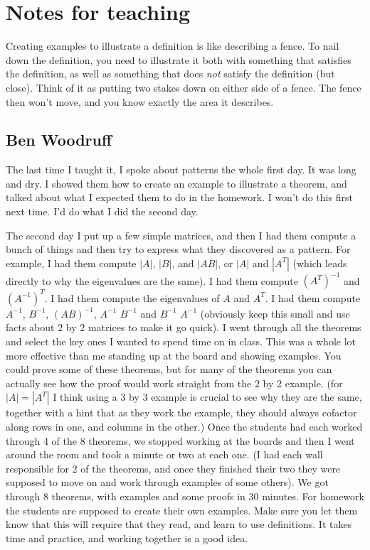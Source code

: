 \section{Notes for teaching}

Creating examples to illustrate a definition is like describing a fence.  To nail down the definition, you need to illustrate it both with something that satisfies the definition, as well as something that does \emph{not} satisfy the definition (but close).  Think of it as putting two stakes down on either side of a fence.  The fence then won't move, and you know exactly the area it describes.

\subsection{Ben Woodruff}
\label{sec:ben-woodruff}


The last time I taught it, I spoke about patterns the whole first day. It was long and dry.  I showed them how to create an example to illustrate a theorem, and talked about what I expected them to do in the homework.  I won't do this first next time.  I'd do what I did the second day.

The second day I put up a few simple matrices, and then I had them compute a bunch of things and then try to express what they discovered as a pattern. For example, I had them compute $|A|$, $|B|$, and $|AB|$, or $|A|$ and $|A^T|$ (which leads directly to why the eigenvalues are the same).  I had them compute $(A^T)^{-1}$ and $(A^{-1})^T$.  I had them compute the eigenvalues of $A$ and $A^T$.  I had them compute $A^{-1}$, $B^{-1}$, $(AB)^{-1}$, $A^{-1}$ $B^{-1}$ and $B^{-1}$ $A^{-1}$ (obviously keep this small and use facts about 2 by 2 matrices to make it go quick). I went through all the theorems and select the key ones I wanted to spend time on in class.  This was a whole lot more effective than me standing up at the board and showing examples.  You could prove some of these theorems, but for many of the theorems you can actually see how the proof would work straight from the 2 by 2 example.  (for $|A|=|A^T|$ I think using a 3 by 3 example is crucial to see why they are the same, together with a hint that as they work the example, they should always cofactor along rows in one, and columns in the other.) Once the students had each worked through 4 of the 8 theorems, we stopped working at the boards and then I went around the room and took a minute or two at each one.  (I had each wall responsible for 2 of the theorems, and once they finished their two they were supposed to move on and work through examples of some others). We got through 8 theorems, with examples and some proofs in 30 minutes.  For homework the students are supposed to create their own examples.  Make sure you let them know that this will require that they read, and learn to use definitions.  It takes time and practice, and working together is a good idea.

